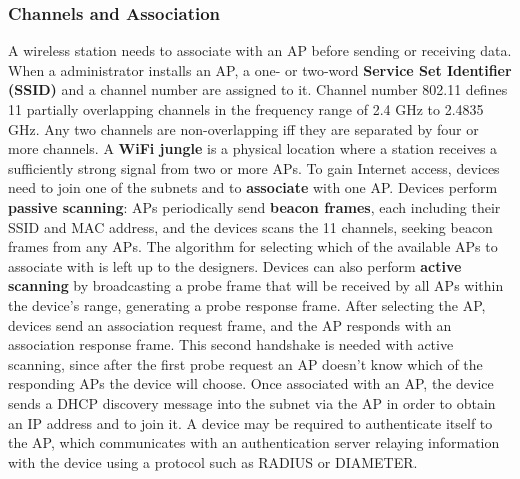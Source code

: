 \documentclass{article}
\begin{document}
\subsubsection*{Channels and Association}
A wireless station needs to associate with an AP before sending or receiving data.
When a administrator installs an AP, a one- or two-word \textbf{Service Set Identifier (SSID)} and a channel number are assigned to it.
Channel number 802.11 defines 11 partially overlapping channels in the frequency range of 2.4 GHz to 2.4835 GHz.
Any two channels are non-overlapping iff they are separated by four or more channels.
A \textbf{WiFi jungle} is a physical location where a station receives a sufficiently strong signal from two or more APs.
To gain Internet access, devices need to join one of the subnets and to \textbf{associate} with one AP.
Devices perform \textbf{passive scanning}: APs periodically send \textbf{beacon frames}, each including their SSID and MAC address, and the devices scans the 11 channels, seeking beacon frames from any APs.
The algorithm for selecting which of the available APs to associate with is left up to the designers.
Devices can also perform \textbf{active scanning} by broadcasting a probe frame that will be received by all APs within the device’s range, generating a probe response frame. 
After selecting the AP, devices send an association request frame, and the AP responds with an association response frame.
This second handshake is needed with active scanning, since after the first probe request an AP doesn’t know which of the responding APs the device will choose.
Once associated with an AP, the device sends a DHCP discovery message into the subnet via the AP in order to obtain an IP address and to join it.
A device may be required to authenticate itself to the AP, which communicates with an authentication server relaying information with the device using a protocol such as RADIUS or DIAMETER.
\end{document}
